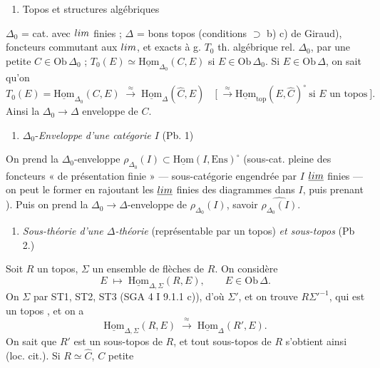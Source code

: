 \documentclass[11pt,a4paper]{article}
\begin{document}
\begin{enumerate}
  \item[$1$)] Topos et structures algébriques \ill{}
\end{enumerate}
$\Delta_0$ = cat. avec $\varprojlim$ finies ; $\Delta$ = bons topos (conditions
$\supset$ b) c) de Giraud), foncteurs commutant aux $\varprojlim$, et exacts à g.
$T_0$ th. algébrique rel. $\Delta_0$,   par une
petite $C \in \mathrm{Ob}\,\Delta_0$  ;
$T_0(E) \simeq \underline{\mathrm{Hom}}_{\Delta_0}(C, E)$ si
$E \in \mathrm{Ob}\,\Delta_0$. Si $E \in \mathrm{Ob}\,\Delta$, on sait qu'on
\ill{}
\[
  T_0(E) = \underline{\mathrm{Hom}}_{\Delta_0}(C, E)
  \;\xrightarrow{\ \approx\ }\;
  \underline{\mathrm{Hom}}_{\Delta}(\hat{C}, E)
  \quad
  \bigl[\ \xrightarrow{\ \approx\ } \underline{\mathrm{Hom}}_{\mathrm{top}}(E, \hat{C})^{\circ}
  \ \text{si $E$ un topos}\ \bigr].
\]
Ainsi  \struck{\ill{}} la 
$\Delta_0 \to \Delta$ enveloppe de $C$.

\begin{enumerate}
  \item[$2$)] $\Delta_0$-\emph{Enveloppe d'une  catégorie $I$}
    \quad (Pb. 1)
\end{enumerate}
On prend la $\Delta_0$-enveloppe
$\rho_{\Delta_0}(I) \subset \underline{\mathrm{Hom}}(I, \mathrm{Ens})^{\circ}$
(sous-cat. pleine des foncteurs « de présentation finie » — sous-catégorie
engendrée par $I$ \ill{} $\underline{\varprojlim}$ finies — on peut le former en
rajoutant les $\underline{\varprojlim}$ finies des diagrammes dans $I$, puis
prenant \ill{}). Puis on prend la $\Delta_0 \to \Delta$-enveloppe de
$\rho_{\Delta_0}(I)$, savoir $\widehat{\rho_{\Delta_0}(I)}$.

\begin{enumerate}
  \item[$3$)] \emph{Sous-théorie d'une $\Delta$-théorie} (représentable par un
    topos) \emph{et sous-topos} \quad (Pb 2.)
\end{enumerate}
Soit $R$ un topos, $\Sigma$ un ensemble de flèches de $R$. On considère
\[
  E \;\longmapsto\; \underline{\mathrm{Hom}}_{\Delta, \Sigma}(R, E),
  \qquad E \in \mathrm{Ob}\,\Delta .
\]
On  $\Sigma$ par ST1, ST2, ST3 (SGA 4 I 9.1.1 c)), d'où
$\Sigma'$, et on trouve $R\Sigma'^{-1}$, qui est un topos , et on a
\[
  \underline{\mathrm{Hom}}_{\Delta, \Sigma}(R, E)
  \;\xrightarrow{\ \approx\ }\;
  \underline{\mathrm{Hom}}_{\Delta}(R', E).
\]
On sait que $R'$ est un sous-topos de $R$, et tout sous-topos de $R$ s'obtient
ainsi (loc. cit.). Si $R \simeq \hat{C}$, $C$ petite \ill{}
\end{document}
